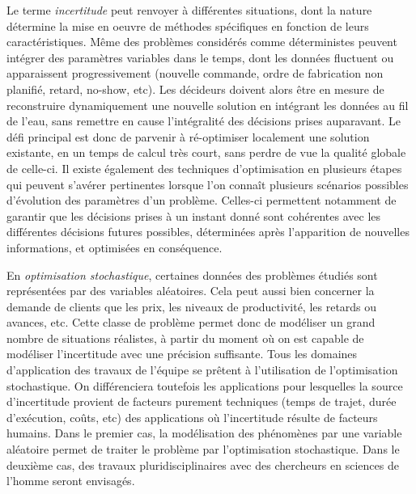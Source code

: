 	Le terme {\em incertitude} peut renvoyer à différentes situations, dont la nature détermine la mise en oeuvre de méthodes spécifiques en fonction de leurs caractéristiques.
	Même des problèmes considérés comme déterministes peuvent intégrer des paramètres variables dans le temps, dont les données fluctuent ou apparaissent progressivement (nouvelle commande, ordre de fabrication non planifié, retard, no-show, etc). 
	Les décideurs doivent alors être en mesure de reconstruire dynamiquement une nouvelle solution en intégrant les données au fil de l'eau, sans remettre en cause l'intégralité des décisions prises auparavant.
%
	Le défi principal est donc de parvenir à ré-optimiser localement une solution existante, en un temps de calcul très court, sans perdre de vue la qualité globale de celle-ci. 
 	Il existe également des techniques d'optimisation en plusieurs étapes qui peuvent s'avérer pertinentes lorsque l'on connaît plusieurs scénarios possibles d'évolution des paramètres d'un problème. Celles-ci permettent notamment de garantir que les décisions prises à un instant donné sont cohérentes avec les différentes décisions futures possibles, déterminées après l'apparition de nouvelles informations, et optimisées en conséquence.
	
	
	En \textit{optimisation stochastique}, certaines données des problèmes étudiés sont représentées par des variables aléatoires. 
	Cela peut aussi bien concerner la demande de clients que les prix, les niveaux de productivité, les retards ou avances, etc. 
	Cette classe de problème permet donc de modéliser un grand nombre de situations réalistes, à partir du moment où on est capable de modéliser l'incertitude avec une précision suffisante. 
	Tous les domaines d'application des travaux de l'équipe se prêtent à l'utilisation de l'optimisation stochastique. On différenciera toutefois les applications pour lesquelles la source d'incertitude provient de facteurs purement techniques (temps de trajet, durée d'exécution, coûts, etc) des applications où l'incertitude résulte de facteurs humains. Dans le premier cas, la modélisation des phénomènes par une variable aléatoire permet de traiter le problème par l'optimisation stochastique. Dans le deuxième cas, des travaux pluridisciplinaires avec des chercheurs en sciences de l'homme   seront envisagés. 
	
